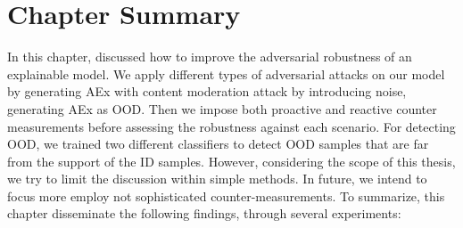 

\section{Chapter Summary} \label{chapter_6:conclusion}
In this chapter, discussed how to improve the adversarial robustness of an explainable model. We apply different types of adversarial attacks on our model by generating AEx with content moderation attack by introducing noise, generating AEx as OOD. Then we impose both proactive and reactive counter measurements before assessing the robustness against each scenario. 
For detecting OOD, we trained two different classifiers to detect OOD samples that are far from the support of the ID samples. However, considering the scope of this thesis, we try to limit the discussion within simple methods. In future, we intend to focus more employ not sophisticated counter-measurements. To summarize, this chapter disseminate the following findings, through several experiments:

